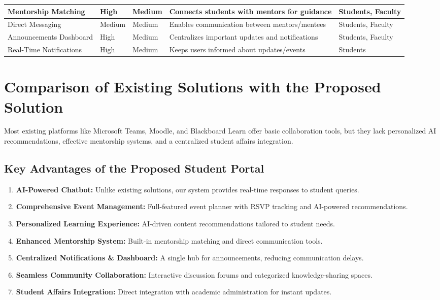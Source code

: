\begin{longtable}{|L{2cm}|C{2.2cm}|C{2cm}|L{4cm}|L{2.5cm}|}
\hline
Mentorship Matching & High & Medium & Connects students with mentors for guidance & Students, Faculty \\
\hline
Direct Messaging & Medium & Medium & Enables communication between mentors/mentees & Students, Faculty \\
\hline
Announcements Dashboard & High & Medium & Centralizes important updates and notifications & Students, Faculty \\
\hline
Real-Time Notifications & High & Medium & Keeps users informed about updates/events & Students \\
\hline
\end{longtable}

\section{Comparison of Existing Solutions with the Proposed Solution}

Most existing platforms like Microsoft Teams, Moodle, and Blackboard Learn offer basic collaboration tools, but they lack personalized AI recommendations, effective mentorship systems, and a centralized student affairs integration.

\subsection*{Key Advantages of the Proposed Student Portal}

\begin{enumerate}
    \item \textbf{AI-Powered Chatbot:} Unlike existing solutions, our system provides real-time responses to student queries.
    \item \textbf{Comprehensive Event Management:} Full-featured event planner with RSVP tracking and AI-powered recommendations.
    \item \textbf{Personalized Learning Experience:} AI-driven content recommendations tailored to student needs.
    \item \textbf{Enhanced Mentorship System:} Built-in mentorship matching and direct communication tools.
    \item \textbf{Centralized Notifications \& Dashboard:} A single hub for announcements, reducing communication delays.
    \item \textbf{Seamless Community Collaboration:} Interactive discussion forums and categorized knowledge-sharing spaces.
    \item \textbf{Student Affairs Integration:} Direct integration with academic administration for instant updates.
\end{enumerate}
